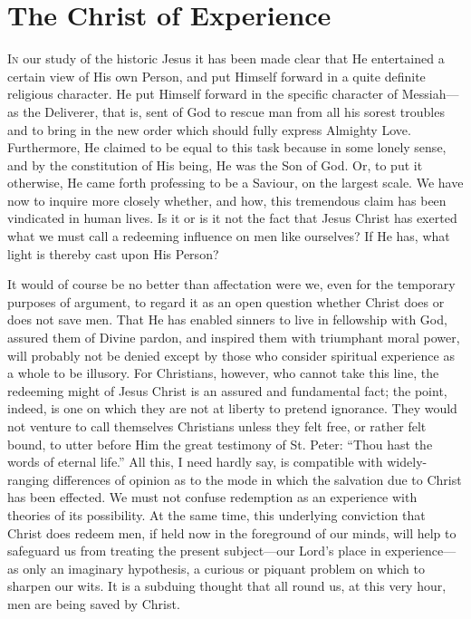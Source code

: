 \documentclass[12pt,a5paper,oneside]{book}
\begin{document}
\chapter{The Christ of Experience}

\textsc{In} our study of the historic Jesus it has
been made clear that He entertained a certain
view of His own Person, and put Himself
forward in a quite definite religious character.
He put Himself forward in the specific character
of Messiah---as the Deliverer, that is, sent of
God to rescue man from all his sorest troubles
and to bring in the new order which should
fully express Almighty Love. Furthermore, He
claimed to be equal to this task because in
some lonely sense, and by the constitution
of His being, He was the Son of God. Or, to
put it otherwise, He came forth professing to
be a Saviour, on the largest scale. We have
now to inquire more closely whether, and how,
this tremendous claim has been vindicated in
human lives. Is it or is it not the fact that
Jesus Christ has exerted what we must call a
redeeming influence on men like ourselves? If
He has, what light is thereby cast upon His
Person?

It would of course be no better than
affectation were we, even for the temporary
purposes of argument, to regard it as an
open question whether Christ does or does not
save men. That He has enabled sinners to live
in fellowship with God, assured them of Divine
pardon, and inspired them with triumphant
moral power, will probably not be denied except
by those who consider spiritual experience as a
whole to be illusory. For Christians, however,
who cannot take this line, the redeeming might
of Jesus Christ is an assured and fundamental
fact; the point, indeed, is one on which they
are not at liberty to pretend ignorance. They
would not venture to call themselves Christians
unless they felt free, or rather felt bound, to
utter before Him the great testimony of St.
Peter: ``Thou hast the words of eternal life.''
All this, I need hardly say, is compatible with
widely-ranging differences of opinion as to the
mode in which the salvation due to Christ has
been effected. We must not confuse redemption
as an experience with theories of its possibility.
At the same time, this underlying conviction
that Christ does redeem men, if held now in the
foreground of our minds, will help to safeguard
us from treating the present subject---our
Lord's place in experience---as only an imaginary
hypothesis, a curious or piquant problem on
which to sharpen our wits. It is a subduing
thought that all round us, at this very hour,
men are being saved by Christ.
\end{document}
